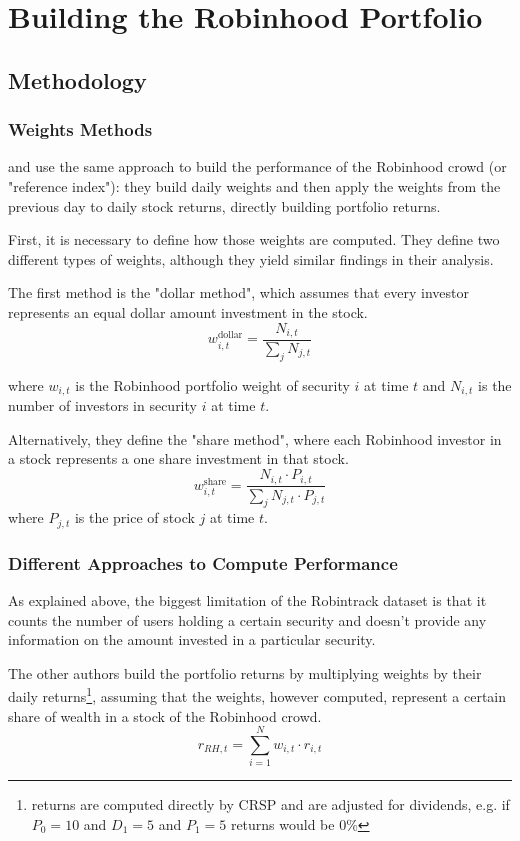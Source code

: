 \section{Building the Robinhood Portfolio}
\subsection{Methodology}
\subsubsection{Weights Methods} 
\cite{Fedyk2024} and \cite{Welch2022} use the same approach to build the performance of the Robinhood crowd (or "reference index"): 
they build daily weights and then apply the weights from the previous day to daily stock returns, directly building portfolio returns. 

First, it is necessary to define how those weights are computed. They define two different types of weights, although they yield similar findings in their analysis.

The first method is the "dollar method", which assumes that every investor represents an equal dollar amount investment in the stock. 
\begin{equation}
    w^{\text{dollar}}_{i,t} = \frac{N_{i,t}}{\sum_j N_{j,t}}
\end{equation}

where $w_{i,t}$ is the Robinhood portfolio weight of security $i$ at time $t$ and $N_{i,t}$ is the number of investors in security $i$ at time $t$.

Alternatively, they define the "share method", where each Robinhood investor in a stock represents a one share investment in that stock.
\begin{equation}
    w^{\text{share}}_{i,t} = \frac{N_{i,t}\cdot P_{i,t}}{\sum_j N_{j,t}\cdot P_{j,t}}
\end{equation}
where $P_{j,t}$ is the price of stock $j$ at time $t$.

\subsubsection{Different Approaches to Compute Performance}
As explained above, the biggest limitation of the Robintrack dataset is that it counts the number of users holding a certain security and doesn't provide any information on the amount invested in a particular security. 

The other authors build the portfolio returns by multiplying weights by their daily returns\footnote{returns are computed directly by CRSP and are adjusted for dividends, e.g. if $P_0=10$ and $D_1=5$ and $P_1=5$ returns would be 0\%}, 
assuming that the weights, however computed, represent a certain share of wealth in a stock of the Robinhood crowd.
\begin{equation}
    r_{RH,t} = \sum_{i=1}^N w_{i,t}\cdot r_{i,t}
\end{equation}

